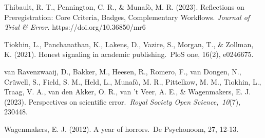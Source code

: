 \documentclass[authordate, editorial,noabstract]{jote-new-article}
\begin{document}
Thibault, R. T., Pennington, C. R., \& Munafò, M. R. (2023). Reflections on Preregistration: Core Criteria, Badges, Complementary Workflows. \emph{Journal of Trial \& Error. }https://doi.org/10.36850/mr6



Tiokhin, L., Panchanathan, K., Lakens, D., Vazire, S., Morgan, T., \& Zollman, K. (2021). Honest signaling in academic publishing. PloS one, 16(2), e0246675.



van Ravenzwaaij, D., Bakker, M., Heesen, R., Romero, F., van Dongen, N., Crüwell, S., Field, S. M., Held, L., Munafò, M. R., Pittelkow, M. M., Tiokhin, L., Traag, V. A., van den Akker, O. R., van 't Veer, A. E., \& Wagenmakers, E. J. (2023). Perspectives on scientific error. \emph{Royal Society Open Science}, \emph{10}(7), 230448.



Wagenmakers, E. J. (2012). A year of horrors. De Psychonoom, 27, 12-13.
\end{document}
